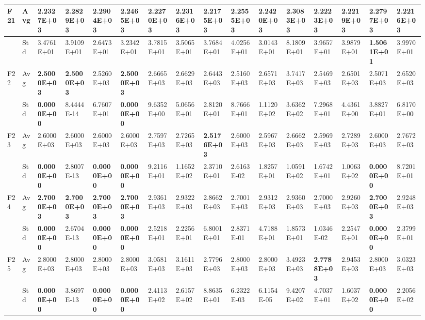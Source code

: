 \documentclass{article} %
\begin{document}
\begin{tabular}{|p{0.3in}|p{0.3in}|p{0.3in}|p{0.3in}|p{0.3in}|p{0.3in}|p{0.3in}|p{0.3in}|p{0.3in}|p{0.3in}|p{0.3in}|p{0.3in}|p{0.3in}|p{0.3in}|p{0.3in}|p{0.5in}|}
F21 & Avg & 2.2327E+03 & 2.2829E+03 & 2.2904E+03 & 2.2465E+03 & 2.2270E+03 & 2.2316E+03 & \textbf{2.2175E+03} & 2.2555E+03 & 2.2420E+03 & 2.3083E+03 & 2.2223E+03 & 2.2219E+03 & 2.2797E+03 & 2.2216E+03 \\ \hline 
 & Std & 3.4761E+01 & 3.9109E+01 & 2.6473E+01 & 3.2342E+01 & 3.7815E+01 & 3.5065E+01 & 3.7684E+01 & 4.0256E+01 & 3.0143E+01 & 8.1809E+01 & 3.9657E+01 & 3.9879E+01 & \textbf{1.5061E+01} & 3.9970E+01 \\ \hline 
F22 & Avg & \textbf{2.5000E+03} & \textbf{2.5000E+03} & 2.5260E+03 & \textbf{2.5000E+03} & 2.6665E+03 & 2.6629E+03 & 2.6443E+03 & 2.5160E+03 & 2.6571E+03 & 3.7417E+03 & 2.5469E+03 & 2.6501E+03 & 2.5071E+03 & 2.6520E+03 \\ \hline 
 & Std & \textbf{0.0000E+00} & 8.4444E-14 & 6.7607E+01 & \textbf{0.0000E+00} & 9.6352E+00 & 5.0656E+01 & 2.8120E+01 & 8.7666E+01 & 1.1120E+02 & 3.6362E+02 & 7.2968E+01 & 4.4361E+00 & 3.8827E+01 & 6.8170E+00 \\ \hline 
F23 & Avg & 2.6000E+03 & 2.6000E+03 & 2.6000E+03 & 2.6000E+03 & 2.7597E+03 & 2.7265E+03 & \textbf{2.5176E+03} & 2.6000E+03 & 2.5967E+03 & 2.6662E+03 & 2.5969E+03 & 2.7289E+03 & 2.6000E+03 & 2.7672E+03 \\ \hline 
 & Std & \textbf{0.0000E+00} & 2.8007E-13 & \textbf{0.0000E+00} & \textbf{0.0000E+00} & 9.2116E+01 & 1.1652E+02 & 2.3710E+01 & 2.6163E-02 & 1.8257E+01 & 1.0591E+02 & 1.6742E+01 & 1.0063E+02 & \textbf{0.0000E+00} & 8.7201E+01 \\ \hline 
F24 & Avg & \textbf{2.7000E+03} & \textbf{2.7000E+03} & \textbf{2.7000E+03} & \textbf{2.7000E+03} & 2.9361E+03 & 2.9322E+03 & 2.8662E+03 & 2.7001E+03 & 2.9312E+03 & 2.9360E+03 & 2.7000E+03 & 2.9260E+03 & \textbf{2.7000E+03} & 2.9248E+03 \\ \hline 
 & Std & \textbf{0.0000E+00} & 2.6704E-13 & \textbf{0.0000E+00} & \textbf{0.0000E+00} & 2.5218E+01 & 2.2256E+01 & 6.8001E+01 & 2.8371E-01 & 4.7188E+01 & 1.8573E+01 & 1.0346E-02 & 2.2547E+01 & \textbf{0.0000E+00} & 2.3799E+01 \\ \hline 
F25 & Avg & 2.8000E+03 & 2.8000E+03 & 2.8000E+03 & 2.8000E+03 & 3.0581E+03 & 3.1611E+03 & 2.7796E+03 & 2.8000E+03 & 2.8000E+03 & 3.4923E+03 & \textbf{2.7788E+03} & 2.9453E+03 & 2.8000E+03 & 3.0323E+03 \\ \hline 
 & Std & \textbf{0.0000E+00} & 3.8697E-13 & \textbf{0.0000E+00} & \textbf{0.0000E+00} & 2.4113E+02 & 2.6157E+02 & 8.8635E+01 & 6.2322E-03 & 6.1154E-05 & 9.4207E+02 & 4.7037E+01 & 1.6037E+02 & \textbf{0.0000E+00} & 2.2056E+02 \\ \hline 

\end{tabular}
\end{document}

